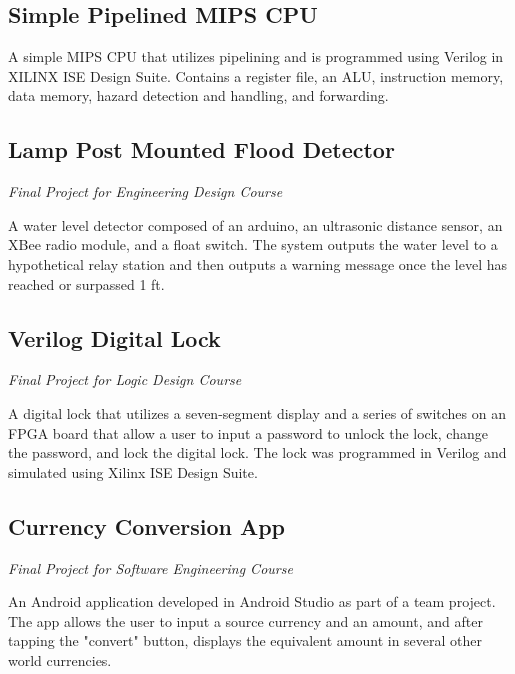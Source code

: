 \documentclass{article}
\begin{document}
\subsection{Simple Pipelined MIPS CPU} 

A simple MIPS CPU that utilizes pipelining and is programmed using Verilog in XILINX ISE Design Suite. Contains a register file, an ALU, instruction memory, data memory, hazard detection and handling, and forwarding.
\vspace{-.75em}
\subsection{Lamp Post Mounted Flood Detector} \textit{Final Project for Engineering Design Course}

A water level detector composed of an arduino, an ultrasonic distance sensor, an XBee radio module, and a float switch. The system outputs the water level to a hypothetical relay station and then outputs a warning message once the level has reached or surpassed 1 ft.
\vspace{-.75em}
\subsection{Verilog Digital Lock} \textit{Final Project for Logic Design Course}

A digital lock that utilizes a seven-segment display and a series of switches on an FPGA board that allow a user to input a password to unlock the lock, change the password, and lock the digital lock. The lock was programmed in Verilog and simulated using Xilinx ISE Design Suite.
\vspace{-.75em}
\subsection{Currency Conversion App} \textit{Final Project for Software Engineering Course}

An Android application developed in Android Studio as part of a team project. The app allows the user to input a source currency and an amount, and after tapping the "convert" button, displays the equivalent amount in several other world currencies.
\end{document}
